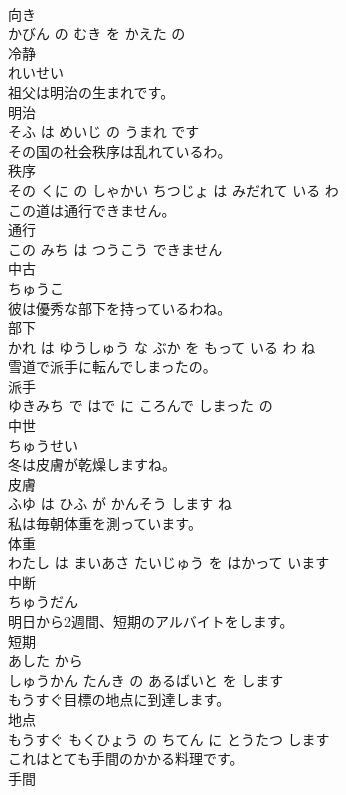 \documentclass[8pt]{extreport}
\begin{document}
\begin{CJK}{UTF8}{min}
\\	向き 
\\	かびん の むき を かえた の			
\\	冷静	
\\	れいせい			
\\	祖父は明治の生まれです。	
\\	明治 
\\	そふ は めいじ の うまれ です			
\\	その国の社会秩序は乱れているわ。	
\\	秩序 
\\	その くに の しゃかい ちつじょ は みだれて いる わ			
\\	この道は通行できません。	
\\	通行 
\\	この みち は つうこう できません			
\\	中古	
\\	ちゅうこ			
\\	彼は優秀な部下を持っているわね。	
\\	部下 
\\	かれ は ゆうしゅう な ぶか を もって いる わ ね			
\\	雪道で派手に転んでしまったの。	
\\	派手 
\\	ゆきみち で はで に ころんで しまった の			
\\	中世	
\\	ちゅうせい			
\\	冬は皮膚が乾燥しますね。	
\\	皮膚 
\\	ふゆ は ひふ が かんそう します ね			
\\	私は毎朝体重を測っています。	
\\	体重 
\\	わたし は まいあさ たいじゅう を はかって います			
\\	中断	
\\	ちゅうだん			
\\	明日から2週間、短期のアルバイトをします。	
\\	短期 
\\	あした から 
\\	しゅうかん たんき の あるばいと を します			
\\	もうすぐ目標の地点に到達します。	
\\	地点 
\\	もうすぐ もくひょう の ちてん に とうたつ します			
\\	これはとても手間のかかる料理です。	
\\	手間 

\end{CJK}
\end{document}
